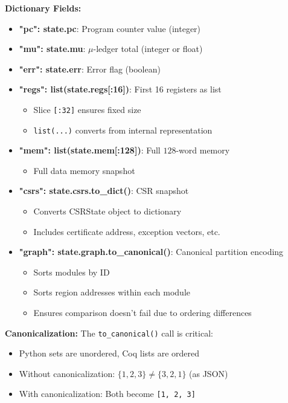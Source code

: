\textbf{Dictionary Fields:}
\begin{itemize}
    \item \textbf{"pc": state.pc}: Program counter value (integer)
    \item \textbf{"mu": state.mu}: $\mu$-ledger total (integer or float)
    \item \textbf{"err": state.err}: Error flag (boolean)
    \item \textbf{"regs": list(state.regs[:16])}: First 16 registers as list
    \begin{itemize}
        \item Slice \texttt{[:32]} ensures fixed size
        \item \texttt{list(...)} converts from internal representation
    \end{itemize}
    \item \textbf{"mem": list(state.mem[:128])}: Full $128$-word memory
    \begin{itemize}
        \item Full data memory snapshot
    \end{itemize}
    \item \textbf{"csrs": state.csrs.to\_dict()}: CSR snapshot
    \begin{itemize}
        \item Converts CSRState object to dictionary
        \item Includes certificate address, exception vectors, etc.
    \end{itemize}
    \item \textbf{"graph": state.graph.to\_canonical()}: Canonical partition encoding
    \begin{itemize}
        \item Sorts modules by ID
        \item Sorts region addresses within each module
        \item Ensures comparison doesn't fail due to ordering differences
    \end{itemize}
\end{itemize}

\textbf{Canonicalization:} The \texttt{to\_canonical()} call is critical:
\begin{itemize}
    \item Python sets are unordered, Coq lists are ordered
    \item Without canonicalization: $\{1, 2, 3\} \neq \{3, 2, 1\}$ (as JSON)
    \item With canonicalization: Both become \texttt{[1, 2, 3]}
\end{itemize}

